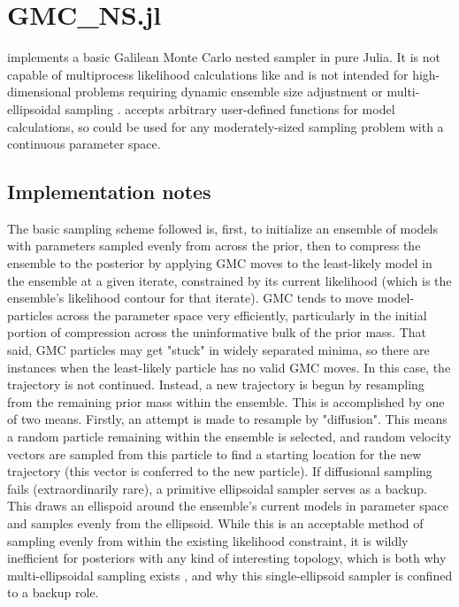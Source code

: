 \chapter{GMC\_NS.jl}

 implements a basic Galilean Monte Carlo nested sampler \cite{Skilling2012} in pure Julia. It is not capable of multiprocess likelihood calculations like  and is not intended for high-dimensional problems requiring dynamic ensemble size adjustment \cite{Higson2019} or multi-ellipsoidal sampling \cite{Feroz2009}.  accepts arbitrary user-defined functions for model calculations, so could be used for any moderately-sized sampling problem with a continuous parameter space.

\section{Implementation notes}

The basic sampling scheme followed is, first, to initialize an ensemble of models with parameters sampled evenly from across the prior, then to compress the ensemble to the posterior by applying GMC moves to the least-likely model in the ensemble at a given iterate, constrained by its current likelihood (which is the ensemble's likelihood contour for that iterate). GMC tends to move model-particles across the parameter space very efficiently, particularly in the initial portion of compression across the uninformative bulk of the prior mass. That said, GMC particles may get "stuck" in widely separated minima, so there are instances when the least-likely particle has no valid GMC moves. In this case, the trajectory is not continued. Instead, a new trajectory is begun by resampling from the remaining prior mass within the ensemble. This is accomplished by one of two means. Firstly, an attempt is made to resample by "diffusion". This means a random particle remaining within the ensemble is selected, and random velocity vectors are sampled from this particle to find a starting location for the new trajectory (this vector is conferred to the new particle). If diffusional sampling fails (extraordinarily rare), a primitive ellipsoidal sampler serves as a backup. This draws an ellispoid around the ensemble's current models in parameter space and samples evenly from the ellipsoid. While this is an acceptable method of sampling evenly from within the existing likelihood constraint, it is wildly inefficient for posteriors with any kind of interesting topology, which is both why multi-ellipsoidal sampling exists \cite{Feroz2009}, and why this single-ellipsoid sampler is confined to a backup role.

